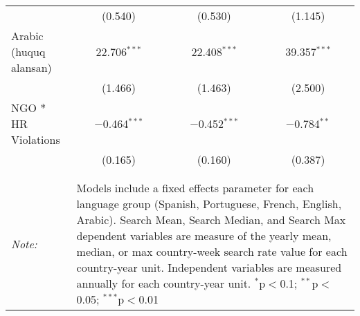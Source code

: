 \begin{table}[!htbp]
\begin{tabular}{@{\extracolsep{5pt}}lccc}
  & (0.540) & (0.530) & (1.145) \\ 
  Arabic (huquq alansan) & 22.706$^{***}$ & 22.408$^{***}$ & 39.357$^{***}$ \\ 
  & (1.466) & (1.463) & (2.500) \\ 
  NGO * HR Violations & $-$0.464$^{***}$ & $-$0.452$^{***}$ & $-$0.784$^{**}$ \\ 
  & (0.165) & (0.160) & (0.387) \\ 
 \hline \\[-1.8ex] 
\hline 
\hline \\[-1.8ex] 
\textit{Note:}  & \multicolumn{3}{l}{\parbox[t]{8cm}{Models include a fixed effects parameter for each language group (Spanish, Portuguese, French, English, Arabic). Search Mean, Search Median, and Search Max dependent variables are measure of the yearly mean, median, or max country-week search rate value for each country-year unit. Independent variables are measured annually for each country-year unit. $^{*}$p$<$0.1; $^{**}$p$<$0.05; $^{***}$p$<$0.01}} \\ 
\end{tabular} 
\end{table} 

